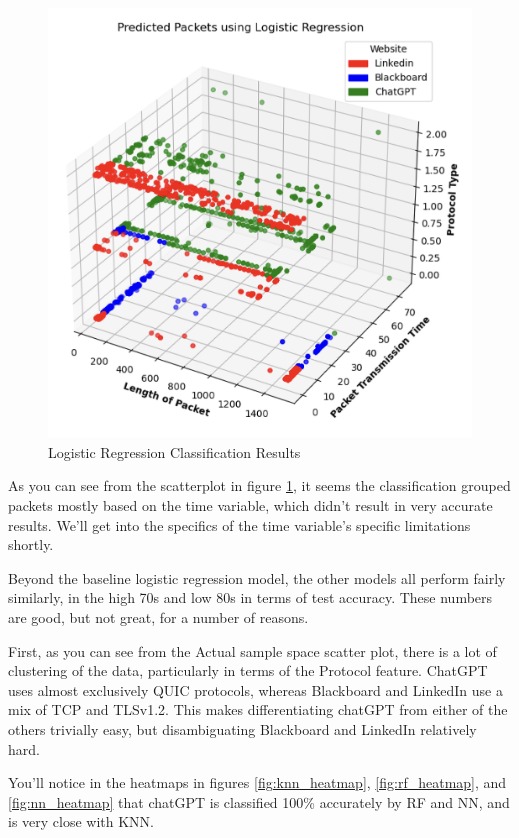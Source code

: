 \documentclass[10pt,sigconf,letterpaper,nonacm]{acmart}
\begin{document}
\begin{figure}
    \centering
    \includegraphics[width=1\linewidth]{Figures_and_Graphs/logRegFig.png}
    \caption{Logistic Regression Classification Results}
    \label{fig:log_reg_scatter}
\end{figure}

As you can see from the scatterplot in figure \ref{fig:log_reg_scatter}, it seems the classification grouped packets mostly based on the time variable, which didn't result in very accurate results. We'll get into the specifics of the time variable's specific limitations shortly.

Beyond the baseline logistic regression model, the other models all perform fairly similarly, in the high 70s and low 80s in terms of test accuracy.
These numbers are good, but not great, for a number of reasons.

First, as you can see from the Actual sample space scatter plot, there is a lot of clustering of the data, particularly in terms of the Protocol feature. ChatGPT uses almost exclusively QUIC protocols, whereas Blackboard and LinkedIn use a mix of TCP and TLSv1.2. This makes differentiating chatGPT from either of the others trivially easy, but disambiguating Blackboard and LinkedIn relatively hard.

You'll notice in the heatmaps in figures \ref{fig:knn_heatmap}, \ref{fig:rf_heatmap}, and \ref{fig:nn_heatmap} that chatGPT is classified 100\% accurately by RF and NN, and is very close with KNN. 
\end{document}
